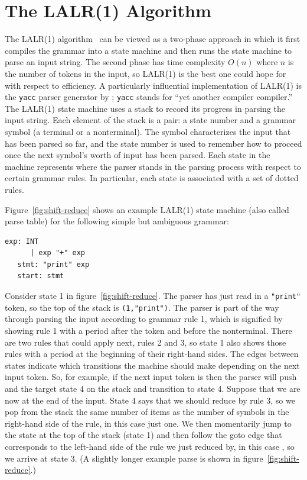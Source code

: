 \documentclass[7x10]{TimesAPriori_MIT}%
\numberwithin{theorem}{chapter}
\numberwithin{definition}{chapter}
\numberwithin{equation}{chapter}
\begin{document}
{\section{The LALR(1) Algorithm}
\label{sec:lalr}

The LALR(1) algorithm~\citep{DeRemer69,Anderson73} can be viewed as a
two-phase approach in which it first compiles the grammar into a state
machine and then runs the state machine to parse an input string.  The
second phase has time complexity $O(n)$ where $n$ is the number of
tokens in the input, so LALR(1) is the best one could hope for with
respect to efficiency.
%
A particularly influential implementation of LALR(1) is the
\texttt{yacc} parser generator by \citet{Johnson:1979qy};
\texttt{yacc} stands for ``yet another compiler compiler.''
%
The LALR(1) state machine uses a stack to record its progress in
parsing the input string.  Each element of the stack is a pair: a
state number and a grammar symbol (a terminal or a nonterminal). The
symbol characterizes the input that has been parsed so far, and the
state number is used to remember how to proceed once the next
symbol's worth of input has been parsed.  Each state in the machine
represents where the parser stands in the parsing process with respect
to certain grammar rules. In particular, each state is associated with
a set of dotted rules.

Figure~\ref{fig:shift-reduce} shows an example LALR(1) state machine
(also called parse table) for the following simple but ambiguous
grammar:
\begin{lstlisting}[escapechar=$]
   exp: INT
      | exp "+" exp
   stmt: "print" exp
   start: stmt
\end{lstlisting}
Consider state 1 in figure~\ref{fig:shift-reduce}. The parser has just
read in a \lstinline{"print"} token, so the top of the stack is
\lstinline{(1,"print")}. The parser is part of the way through parsing
the input according to grammar rule 1, which is signified by showing
rule 1 with a period after the  token and before the
 nonterminal. There are two rules that could apply next,
rules 2 and 3, so state 1 also shows those rules with a period at
the beginning of their right-hand sides. The edges between states
indicate which transitions the machine should make depending on the
next input token. So, for example, if the next input token is
 then the parser will push  and the target state 4
on the stack and transition to state 4.  Suppose that we are now at the end
of the input. State 4 says that we should reduce by rule 3, so we pop
from the stack the same number of items as the number of symbols in
the right-hand side of the rule, in this case just one.  We then
momentarily jump to the state at the top of the stack (state 1) and
then follow the goto edge that corresponds to the left-hand side of
the rule we just reduced by, in this case , so we arrive at
state 3.  (A slightly longer example parse is shown in
figure~\ref{fig:shift-reduce}.)

}
\end{document}
